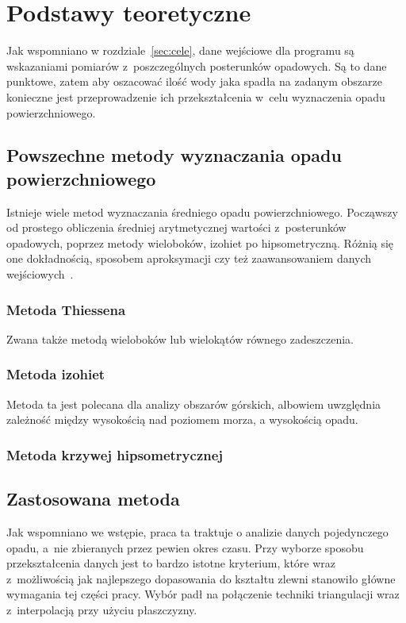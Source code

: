 \chapter{Podstawy teoretyczne}
Jak wspomniano w rozdziale~\ref{sec:cele}, dane wejściowe dla programu są wskazaniami pomiarów z~poszczególnych posterunków opadowych. Są to dane punktowe, zatem aby oszacować ilość wody jaka spadła na zadanym obszarze konieczne jest przeprowadzenie ich przekształcenia w~celu wyznaczenia opadu powierzchniowego.

\section{Powszechne metody wyznaczania opadu powierzchniowego}

Istnieje wiele metod wyznaczania średniego opadu powierzchniowego. Począwszy od prostego obliczenia średniej arytmetycznej wartości z~posterunków opadowych, poprzez metody wieloboków, izohiet po hipsometryczną. Różnią się one dokładnością, sposobem aproksymacji czy też zaawansowaniem danych wejściowych~\cite{opad_metody, obliczanie_opadu_sredniego}.

\subsection{Metoda Thiessena}
Zwana także metodą wieloboków lub wielokątów równego zadeszczenia.
\subsection{Metoda izohiet}

Metoda ta jest polecana dla analizy obszarów górskich, albowiem uwzględnia zależność między wysokością nad poziomem morza, a wysokością opadu.
\subsection{Metoda krzywej hipsometrycznej}

\section{Zastosowana metoda}
\label{sec:zastosowana_metoda}
Jak wspomniano we wstępie, praca ta traktuje o analizie danych pojedynczego opadu, a~nie zbieranych przez pewien okres czasu. Przy wyborze sposobu przekształcenia danych jest to bardzo istotne kryterium, które wraz z~możliwością jak najlepszego dopasowania do kształtu zlewni stanowiło główne wymagania tej części pracy. Wybór padł na połączenie techniki triangulacji wraz z~interpolacją przy użyciu płaszczyzny.

